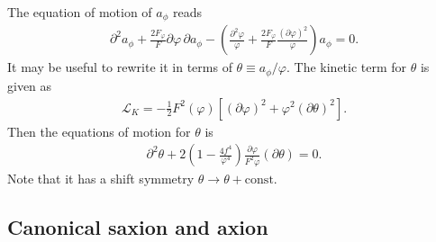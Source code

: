 \documentclass[12pt, a4paper]{article}
\begin{document}
The equation of motion of $a_\phi$ reads
\begin{align}
	\partial^2 a_\phi + \frac{2F_\varphi}{F}\partial \varphi \,\partial a_\phi
	- \left(\frac{\partial^2 \varphi}{\varphi} + \frac{2F_\varphi}{F}\frac{\left(\partial \varphi\right)^2}{\varphi} \right)a_\phi
	= 0.
\end{align}
It may be useful to rewrite it in terms of $\theta\equiv a_\phi/\varphi$.
The kinetic term for $\theta$ is given as
\begin{align}
	\mathcal L_K = -\frac{1}{2}F^2(\varphi) \left[ (\partial\varphi)^2+\varphi^2(\partial\theta)^2 \right].
\end{align}
Then the equations of motion for $\theta$ is
\begin{align}
	\partial^2 \theta + 2\left(1 - \frac{4f^4}{\varphi^4}\right)\frac{\partial\varphi}{F^2\varphi}
	(\partial\theta)=0.  \label{eom_theta}
\end{align}
Note that it has a shift symmetry $\theta \rightarrow \theta + \mathrm{const}$.

\subsection{Canonical saxion and axion}
\end{document}

